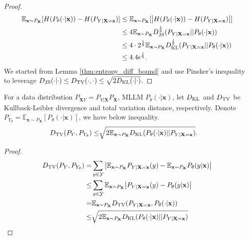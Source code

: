 \begin{proof}
\begin{equation*}
\begin{split}
    \mathbb{E}_{\mathbf{x}\sim P_{\mathbf{X}}} [ H( P_{\theta}(\cdot|\mathbf{x})) - H(P_{Y|\mathbf{X}=\mathbf{x}})]
    & \leq \mathbb{E}_{\mathbf{x}\sim P_{\mathbf{X}}} [ \big| H( P_{\theta}(\cdot|\mathbf{x})) - H(P_{Y|\mathbf{X}=\mathbf{x}}) \big| ] \\ 
    & \leq 4 \mathbb{E}_{\mathbf{x}\sim P_{\mathbf{X}}} D^{\frac{1}{4}}_{\rm JS}(P_{Y|\mathbf{X}=\mathbf{x}}|| P_{\theta}(\cdot|\mathbf{x})) \\ 
    & \leq 4\cdot2^{\frac{1}{8}} \mathbb{E}_{\mathbf{x}\sim P_{\mathbf{X}}} D^{\frac{1}{8}}_{\rm KL}(P_{Y|\mathbf{X}=\mathbf{x}}|| P_{\theta}(\cdot|\mathbf{x})) \\ 
    & \leq  4.4 \epsilon^{\frac{1}{8}}.
\end{split}
\end{equation*}
We started from Lemma \ref{thm:entropy_diff_bound} and use Pinsker's inequality \cite{pinsker1964information} to leverage $D_{\rm JS}(\cdot|\cdot)\leq D_{\rm TV}(\cdot,\cdot)\leq \sqrt{2 D_{\rm KL}(\cdot|\cdot)}$.
\end{proof}

\begin{lemma}\label{TV_KL}
For a data distribution $P_{\mathbf{X}Y}=P_{Y|\mathbf{X}}P_{\mathbf{X}}$, MLLM $P_{\theta}(\cdot|\mathbf{x})$, let $D_{\rm KL}$ and $D_{\rm TV}$ be Kullback-Leibler divergence and total variation distance, respectively. Denote $P_{Y_{\theta}}=\mathbb{E}_{\mathbf{x}\sim P_{\mathbf{X}}}[P_{\theta}(\cdot|\mathbf{x})]$, we have below inequality.
 \begin{equation*}
    \begin{split}
        D_{\rm TV}(P_{Y},P_{Y_{\theta}}) \leq &  \sqrt{2\mathbb{E}_{\mathbf{x}\sim P_{\mathbf{X}}}  D_{\rm KL}(P_{\theta}(\cdot|\mathbf{x})||P_{Y|\mathbf{X}=\mathbf{x}}  )}  .
        \end{split}
    \end{equation*}
\end{lemma}
\begin{proof}
    \begin{equation*}
    \begin{split}
       D_{\rm TV}(P_{Y},P_{Y_{\theta}})=& \sum_{y\in \mathcal{Y}} \big |\mathbb{E}_{\mathbf{x}\sim P_{\mathbf{X}}} P_{Y|\mathbf{X}=\mathbf{x}}(y)-\mathbb{E}_{\mathbf{x}\sim P_{\mathbf{X}}} P_{\theta}(y|\mathbf{x})\big | \\ \leq &  \sum_{y\in \mathcal{Y}} \mathbb{E}_{\mathbf{x}\sim P_{\mathbf{X}}}  \big |P_{Y|\mathbf{X}=\mathbf{x}}(y)-P_{\theta}(y|\mathbf{x})\big | \\ = &
       \mathbb{E}_{\mathbf{x}\sim P_{\mathbf{X}}}  D_{\rm TV} (P_{Y|\mathbf{X}=\mathbf{x}}, P_{\theta}(\cdot|\mathbf{x}))    \\ \leq &  \sqrt{2\mathbb{E}_{\mathbf{x}\sim P_{\mathbf{X}}}  D_{\rm KL}(P_{\theta}(\cdot|\mathbf{x}) || P_{Y|\mathbf{X}=\mathbf{x}}  )}  
        \end{split}
    \end{equation*}
\end{proof}


